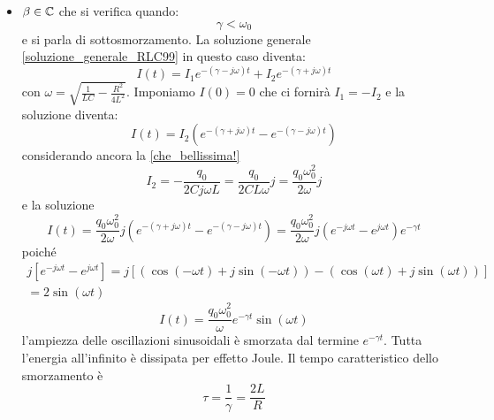 \begin{itemize}
\begin{equation}
\end{equation}
\item{$\beta\in\mathbb{C}$} che si verifica quando:
\begin{equation}
\gamma<\omega_0
\end{equation}
e si parla di sottosmorzamento. La soluzione generale \eqref{soluzione_generale_RLC99} in questo caso diventa:
\begin{equation}
I(t)=I_1e^{-(\gamma-j \omega)t}+I_2e^{-(\gamma+j \omega)t}
\end{equation}
con $\omega=\sqrt{\frac{1}{LC}-\frac{R^2}{4L^2}}$. Imponiamo $I(0)=0$ che ci fornirà $I_1=-I_2$ e la soluzione diventa:
\begin{equation}
I(t)=I_2\left(e^{-(\gamma+j\omega)t}-e^{-(\gamma-j\omega)t}\right)
\end{equation}
considerando ancora la \eqref{che_bellissima!}
\begin{equation}
I_2=-\frac{q_0}{2Cj\omega L}=\frac{q_0}{2CL\omega}j=\frac{q_0\omega_0^2}{2\omega}j
\end{equation}
e la soluzione
\begin{equation}
I(t)=\frac{q_0\omega_0^2}{2\omega}j\left(e^{-(\gamma+j\omega)t}-e^{-(\gamma-j\omega)t}\right)=\frac{q_0\omega_0^2}{2\omega}j\left(e^{-j\omega t}-e^{j\omega t}\right)e^{-\gamma t}
\end{equation}
poiché
\begin{multline}
j\left[e^{-j\omega t}-e^{j\omega t}\right]=j\left[\left(\cos(-\omega t)+j\sin(-\omega
t)\right)-\left(\cos(\omega t)+j\sin(\omega t)\right)\right]\\
=2\sin(\omega t)
\end{multline}
\begin{equation}
I(t)=\frac{q_0\omega_0^2}{\omega}e^{-\gamma t}\sin(\omega t)
\end{equation}
l'ampiezza delle oscillazioni sinusoidali è smorzata dal termine $e^{-\gamma t}$. Tutta l'energia all'infinito è dissipata per effetto Joule. Il tempo caratteristico dello smorzamento è 
\begin{equation}
\tau=\frac{1}{\gamma}=\frac{2L}{R}
\end{equation}
\end{itemize}
